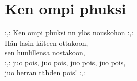 \section{Ken ompi phuksi}

:,: Ken ompi phuksi nn ylös nouskohon :,:\\
Hän lasin käteen ottakoon,\\
sen huulillensa nostakoon,\\
:,: juo pois, juo pois, juo pois, juo pois,\\
juo herran tähden pois! :,:
